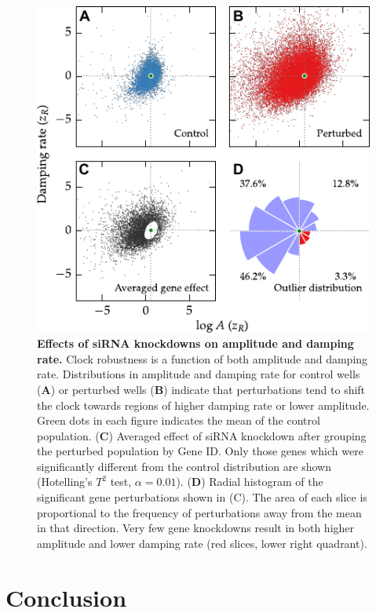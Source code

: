 \documentclass[11pt, letterpaper]{article}
\begin{document}
\begin{figure}[tbp]
  \begin{center}
    \includegraphics[]{figures/pdfs/outliers.pdf}
  \end{center}
  \caption{{\bfseries Effects of siRNA knockdowns on amplitude and damping rate.}
  Clock robustness is a function of both amplitude and damping rate.
  Distributions in amplitude and damping rate for control wells ({\bfseries A}) or perturbed wells ({\bfseries B}) indicate that perturbations tend to shift the clock towards regions of higher damping rate or lower amplitude. Green dots in each figure indicates the mean of the control population.
({\bfseries C}) Averaged effect of siRNA knockdown after grouping the perturbed population by Gene ID. Only those genes which were significantly different from the control distribution are shown (Hotelling's $T^2$ test, $\alpha = 0.01$).
({\bfseries D}) Radial histogram of the significant gene perturbations shown in (C). The area of each slice is proportional to the frequency of perturbations away from the mean in that direction. Very few gene knockdowns result in both higher amplitude and lower damping rate (red slices, lower right quadrant).
}
\label{fig:outlier_dist}
\end{figure}

\section*{Conclusion}
\end{document}
